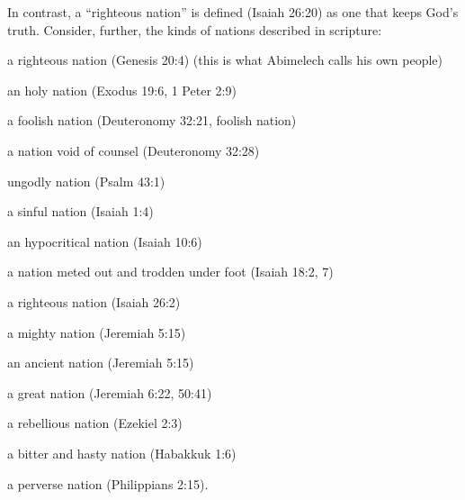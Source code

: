 In contrast, a ``righteous nation'' is defined (Isaiah 26:20) as one that keeps God's truth. Consider, further, the kinds of nations described in scripture: \begin{inparaenum} [(1.)]\item a righteous nation (Genesis 20:4) (this is what Abimelech calls his own people) \item an holy nation (Exodus 19:6, 1 Peter 2:9) \item a foolish nation (Deuteronomy 32:21, foolish nation) \item a nation void of counsel (Deuteronomy 32:28) \item ungodly nation (Psalm 43:1) \item a sinful nation (Isaiah 1:4) \item an hypocritical nation (Isaiah 10:6) \item a nation meted out and trodden under foot (Isaiah 18:2, 7) \item a righteous nation (Isaiah 26:2) \item a mighty nation (Jeremiah 5:15) \item an ancient nation (Jeremiah 5:15) \item a great nation (Jeremiah 6:22, 50:41) \item a rebellious nation (Ezekiel 2:3) \item a bitter and hasty nation (Habakkuk 1:6) \item a perverse nation (Philippians 2:15).\end{inparaenum} \cite{Ruckman1992Psalms} 

